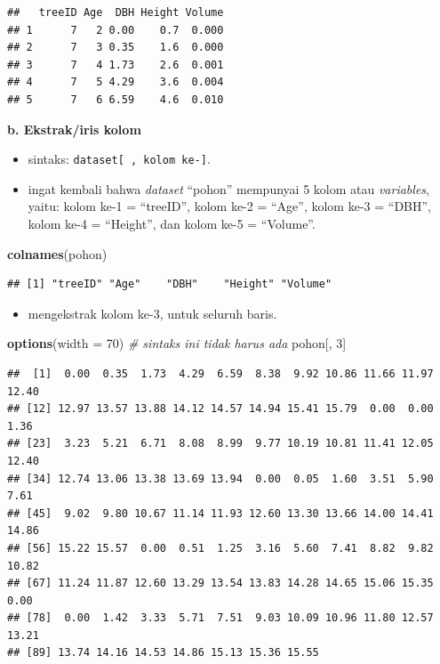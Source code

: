 \documentclass[
  12pt,
  a4paper,
]{scrbook}
\newenvironment{Shaded}{\begin{snugshade}}{\end{snugshade}}
\newcommand{\CommentTok}[1]{\textcolor[rgb]{0.56,0.35,0.01}{\textit{#1}}}
\newcommand{\DataTypeTok}[1]{\textcolor[rgb]{0.13,0.29,0.53}{#1}}
\newcommand{\DecValTok}[1]{\textcolor[rgb]{0.00,0.00,0.81}{#1}}
\newcommand{\KeywordTok}[1]{\textcolor[rgb]{0.13,0.29,0.53}{\textbf{#1}}}
\newcommand{\NormalTok}[1]{#1}
\providecommand{\tightlist}{%
  \setlength{\itemsep}{0pt}\setlength{\parskip}{0pt}}
\begin{document}
\begin{verbatim}
##   treeID Age  DBH Height Volume
## 1      7   2 0.00    0.7  0.000
## 2      7   3 0.35    1.6  0.000
## 3      7   4 1.73    2.6  0.001
## 4      7   5 4.29    3.6  0.004
## 5      7   6 6.59    4.6  0.010
\end{verbatim}

\textbf{b. Ekstrak/iris kolom}

\begin{itemize}
\tightlist
\item
  sintaks: \texttt{dataset{[}\ ,\ kolom\ ke-{]}}.
\item
  ingat kembali bahwa \emph{dataset} ``pohon'' mempunyai 5 kolom atau
  \emph{variables}, yaitu: kolom ke-1 = ``treeID'', kolom ke-2 =
  ``Age'', kolom ke-3 = ``DBH'', kolom ke-4 = ``Height'', dan kolom ke-5
  = ``Volume''.
\end{itemize}

\begin{Shaded}
\begin{Highlighting}[]
\KeywordTok{colnames}\NormalTok{(pohon)}
\end{Highlighting}
\end{Shaded}

\begin{verbatim}
## [1] "treeID" "Age"    "DBH"    "Height" "Volume"
\end{verbatim}

\begin{itemize}
\tightlist
\item
  mengekstrak kolom ke-3, untuk seluruh baris.
\end{itemize}

\begin{Shaded}
\begin{Highlighting}[]
\KeywordTok{options}\NormalTok{(}\DataTypeTok{width =} \DecValTok{70}\NormalTok{)  }\CommentTok{# sintaks ini tidak harus ada}
\NormalTok{pohon[, }\DecValTok{3}\NormalTok{]}
\end{Highlighting}
\end{Shaded}

\begin{verbatim}
##  [1]  0.00  0.35  1.73  4.29  6.59  8.38  9.92 10.86 11.66 11.97 12.40
## [12] 12.97 13.57 13.88 14.12 14.57 14.94 15.41 15.79  0.00  0.00  1.36
## [23]  3.23  5.21  6.71  8.08  8.99  9.77 10.19 10.81 11.41 12.05 12.40
## [34] 12.74 13.06 13.38 13.69 13.94  0.00  0.05  1.60  3.51  5.90  7.61
## [45]  9.02  9.80 10.67 11.14 11.93 12.60 13.30 13.66 14.00 14.41 14.86
## [56] 15.22 15.57  0.00  0.51  1.25  3.16  5.60  7.41  8.82  9.82 10.82
## [67] 11.24 11.87 12.60 13.29 13.54 13.83 14.28 14.65 15.06 15.35  0.00
## [78]  0.00  1.42  3.33  5.71  7.51  9.03 10.09 10.96 11.80 12.57 13.21
## [89] 13.74 14.16 14.53 14.86 15.13 15.36 15.55
\end{verbatim}
\end{document}
